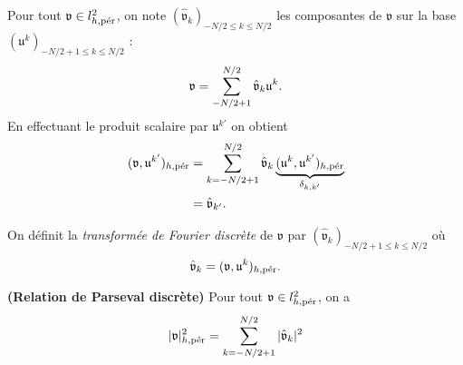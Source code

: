 Pour tout $\mathfrak{v} \in l^2_{h,\per}$, on note $(\hat{\mathfrak{v}}_k )_{-N/2 \leq k \leq N/2}$ les composantes de $\mathfrak{v}$ sur la base $(\mathfrak{u}^k)_{-N/2 +1 \leq k \leq N/2}$ :
\begin{equation}
\mathfrak{v} = \gsum_{-N/2+1}^{N/2} \hat{\mathfrak{v}}_k \mathfrak{u}^k.
\end{equation}
En effectuant le produit scalaire par $\mathfrak{u}^{k'}$ on obtient
\begin{align*}
(\mathfrak{v}, \mathfrak{u}^{k'})_{h,\per} & = \gsum_{k=-N/2+1}^{N/2} \hat{\mathfrak{v}}_k \underbrace{(\mathfrak{u}^k, \mathfrak{u}^{k'})_{h,\per}}_{\delta_{k,k'}} \\
		& = \hat{\mathfrak{v}}_{k'}.
\end{align*}

\begin{definition}
On définit la \textit{transformée de Fourier discrète} de $\mathfrak{v}$ par $(\hat{\mathfrak{v}}_{k})_{-N/2+1 \leq k \leq N/2}$ où
\begin{equation}
\hat{\mathfrak{v}}_{k} = (\mathfrak{v}, \mathfrak{u}^{k})_{h,\per}.
\end{equation}
\end{definition}

\begin{proposition}
\textbf{(Relation de Parseval discrète)} 
Pour tout $\mathfrak{v} \in l^2_{h,\per}$, on a 
\begin{equation}
|\mathfrak{v}|_{h,\per}^2 = \gsum_{k=-N/2+1}^{N/2} |\hat{\mathfrak{v}}_k|^2
\end{equation}
\end{proposition}

